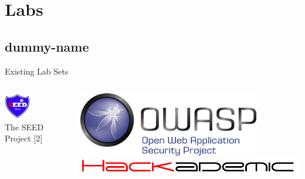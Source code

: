 \documentclass{beamer}
\begin{document}
	\section{Labs}
	\subsection{dummy-name}
	\begin{frame}{Existing Lab Sets}
		\begin{columns}
             		\begin{column}{0.5\textwidth}
				\begin{center}
					\includegraphics[width=0.4\textwidth]{seed-labs-logo.png} \\
	                			The SEED Project [2]
				\end{center}
              		\end{column}
			\pause		
            		\begin{column}{0.5\textwidth}			
				\begin{center}
					\includegraphics[width=0.8\textwidth]{owasp-logo.jpg} \\
					\includegraphics[width=\textwidth]{hackademic-logo.png}
					

\end{center}
\end{column}
\end{columns}
\end{frame}
\end{document}

